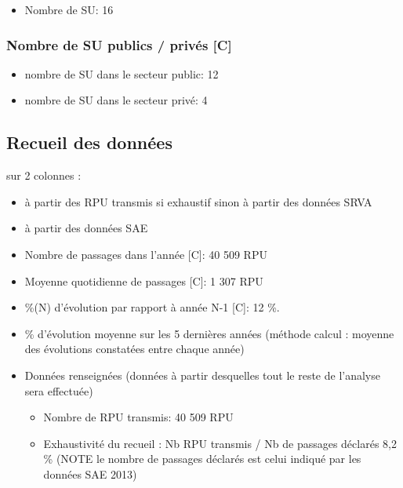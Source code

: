 \documentclass[]{article}
\begin{document}
\begin{itemize}
\itemsep1pt\parskip0pt
\item
  Nombre de SU: 16
\end{itemize}

\subsubsection{Nombre de SU publics / privés
{[}C{]}}\label{nombre-de-su-publics-prives-c}

\begin{itemize}
\itemsep1pt\parskip0pt
\item
  nombre de SU dans le secteur public: 12
\item
  nombre de SU dans le secteur privé: 4
\end{itemize}

\subsection{Recueil des données}\label{recueil-des-donnees}

sur 2 colonnes :

\begin{itemize}
\item
  à partir des RPU transmis si exhaustif sinon à partir des données SRVA
\item
  à partir des données SAE
\item
  Nombre de passages dans l'année {[}C{]}: 40 509 RPU
\item
  Moyenne quotidienne de passages {[}C{]}: 1 307 RPU
\item
  \%(N) d'évolution par rapport à année N-1 {[}C{]}: 12 \%.
\item
  \% d'évolution moyenne sur les 5 dernières années (méthode calcul :
  moyenne des évolutions constatées entre chaque année)
\item
  Données renseignées (données à partir desquelles tout le reste de
  l'analyse sera effectuée)

  \begin{itemize}
  \itemsep1pt\parskip0pt
  \item
    Nombre de RPU transmis: 40 509 RPU
  \item
    Exhaustivité du recueil : Nb RPU transmis / Nb de passages déclarés
    8,2 \% (NOTE le nombre de passages déclarés est celui indiqué par
    les données SAE 2013)
  \end{itemize}
\end{itemize}
\end{document}
